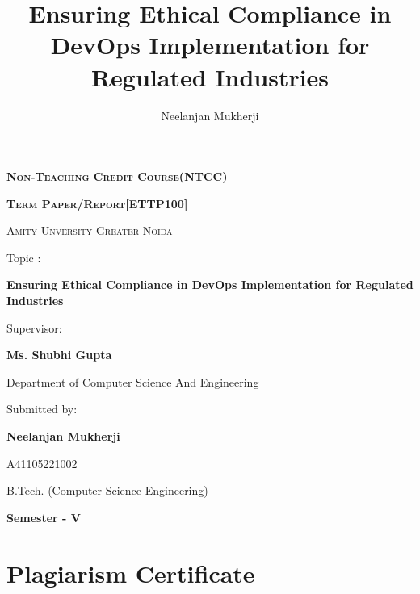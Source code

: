 \documentclass{report}[12pt]
\title{\Huge\textbf{Ensuring Ethical Compliance in DevOps Implementation for Regulated Industries}}
\author{\Large Neelanjan Mukherji}
\begin{document}
\begin{titlepage}
    \centering
    \par
    \vspace*{0.1cm}
    {\scshape\Huge \textbf{Non-Teaching Credit Course(NTCC)} \par}
    {\scshape\Huge \textbf{Term Paper/Report[ETTP100]} \par}
    {\scshape\LARGE Amity Unversity Greater Noida \par}
    \vspace*{1cm}
    {\LARGE Topic : \par}
    \vspace*{0.3cm}
    {\Huge\textbf{Ensuring Ethical Compliance in DevOps Implementation for Regulated Industries}}\par
    \vspace{1cm}
    {\Large Supervisor:}\par

    {\Large \textbf{Ms. Shubhi Gupta}}\par
    {\Large Department of Computer Science And Engineering}\par
    \vspace{1cm}
    {\Large Submitted by:}\par
    {\Large \textbf{Neelanjan Mukherji}}\par
    {\Large A41105221002}\par
    \vspace{1cm}
    {\Large B.Tech. (Computer Science Engineering)}\par
    {\Large \textbf{Semester - V}}\par
\end{titlepage}

\tableofcontents

% 

\chapter*{Plagiarism Certificate}
\end{document}
